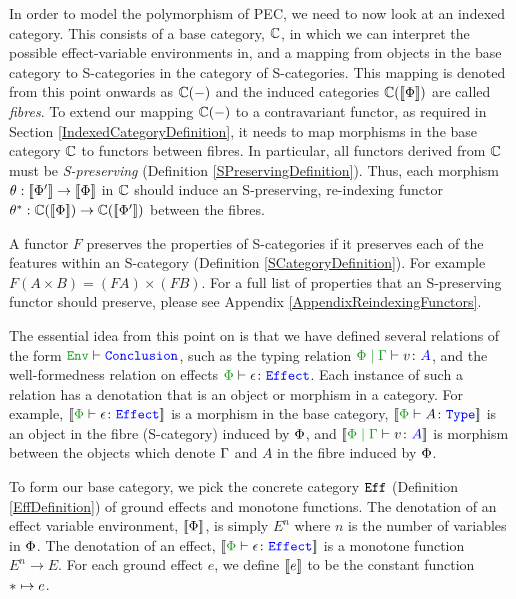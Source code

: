 In order to model the polymorphism of PEC, we need to now look at an indexed category. This consists of a base category, $\C$, in which we can interpret the possible effect-variable environments in, and a mapping from objects in the base category to S-categories in the category of S-categories. This mapping is denoted from this point onwards as $\C(-)$ and the induced categories $\C(\deno{\P})$ are called \textit{fibres}. To extend our mapping $\C(-)$ to a contravariant functor, as required in Section \ref{IndexedCategoryDefinition}, it needs to map morphisms in the base category $\C$ to functors between fibres. In particular, all functors derived from $\C$ must be \textit{S-preserving} (Definition \ref{SPreservingDefinition}). Thus, each morphism $\theta: \deno{\P'}\rightarrow\deno{\P}$ in $\C$ should induce an S-preserving, re-indexing functor $\theta\star: \C(\deno{\P})\rightarrow\C(\deno{\P'})$ between the fibres.


\begin{framed}
    \begin{definition}\label{SPreservingDefinition}
        A functor $F$ preserves the properties of S-categories if it preserves each of the features within an S-category (Definition \ref{SCategoryDefinition}).  For example $F(A\times B) = (FA)\times (FB)$. For a full list of properties that an S-preserving functor should preserve, please see Appendix \ref{AppendixReindexingFunctors}.
    \end{definition}
\end{framed}

The essential idea from this point on is that we have defined several relations of the form $\wellformed{\texttt{Env}}{\texttt{Conclusion}}$, such as the typing relation $\gpetyperelation{v}{A}$, and the well-formedness relation on effects $\wellformedeffect{\P}{\e}$. Each instance of such a relation has a denotation that is an object or morphism in a category. For example, $\deno{\typerelation{\P}{\e}{\effect}}$ is a morphism in the base category, $\deno{\typerelation{\P}{A}{\type}}$ is an object in the fibre (S-category) induced by $\P$, and $\deno{\gpetyperelation{v}{A}}$ is morphism between the objects which denote $\G$ and $A$ in the fibre induced by $\P$.

To form our base category, we pick the concrete category $\Eff$ (Definition \ref{EffDefinition}) of ground effects and monotone functions. The denotation of an effect variable environment, $\deno{\P}$, is simply $E^n$ where $n$ is the number of variables in $\P$. The denotation of an effect, $\deno{\wellformedeffect{\P}{\e}}$ is a monotone function $E^n\rightarrow E$. For each ground effect $e$, we define $\deno{e}$ to be the constant function $\singleton \mapsto e$.


